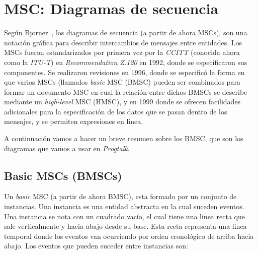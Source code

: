 \documentclass[12pt,a4paper]{report}
\begin{document}
\chapter{MSC: Diagramas de secuencia}
\label{ch:msc}

Según Bjorner~\cite{bjorner}, los diagramas de secuencia (a partir de ahora MSCs), son una notación gráfica para describir intercambios de mensajes entre entidades. Los MSCs fueron estandarizados por primera vez por la \textit{CCITT} (conocida ahora como la \textit{ITU-T}) en \textit{Recommendation Z.120} en 1992, donde se especificaron sus componentes. Se realizaron revisiones en 1996, donde se especificó la forma en que varios MSCs (llamados \textit{basic} MSC (BMSC) pueden ser combinados para formar un documento MSC en cual la relación entre dichos BMSCs se describe mediante un \textit{high-level} MSC (HMSC), y en 1999 donde se ofrecen facilidades adicionales para la especificación de los datos que se pasan dentro de los mensajes, y se permiten expresiones en línea.

A continuación vamos a hacer un breve resumen sobre los BMSC, que son los diagramas que vamos a usar en \textit{Progtalk}.

\section{Basic MSCs (BMSCs)}
Un \textit{basic} MSC (a partir de ahora BMSC), esta formado por un conjunto de instancias. Una instancia es una entidad abstracta en la cual suceden eventos. Una instancia se nota con un cuadrado vacío, el cual tiene una linea recta que sale verticalmente y hacia abajo desde su base. Esta recta representa una linea temporal donde los eventos van ocurriendo por orden cronológico de arriba hacia abajo. Los eventos que pueden suceder entre instancias son:
\end{document}

